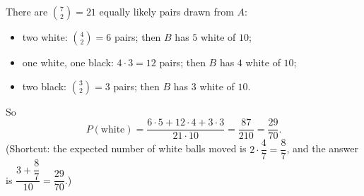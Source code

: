 There are $\binom72=21$ equally likely pairs drawn from $A$:
\begin{itemize}
\item two white: $\binom42=6$ pairs; then $B$ has $5$ white of $10$;
\item one white, one black: $4\cdot3=12$ pairs; then $B$ has $4$ white of $10$;
\item two black: $\binom32=3$ pairs; then $B$ has $3$ white of $10$.
\end{itemize}
So
\[
P(\text{white})=\dfrac{6\cdot5+12\cdot4+3\cdot3}{21\cdot10}=\dfrac{87}{210}=\boxed{\dfrac{29}{70}} .
\]
(Shortcut: the expected number of white balls moved is $2\cdot\dfrac{4}{7}=\dfrac{8}{7}$, and the answer is $\dfrac{3+\dfrac{8}{7}}{10}=\dfrac{29}{70}$.)
